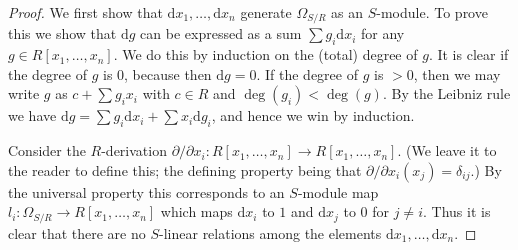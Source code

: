 \documentclass[10pt,a4paper]{amsart}
\theoremstyle{plain}
\theoremstyle{definition}
\theoremstyle{remark}
\numberwithin{equation}{subsection}
\begin{document}
\begin{proof}
We first show that $\text{d}x_1, \ldots, \text{d}x_n$
generate $\Omega_{S/R}$ as an $S$-module. To prove this
we show that $\text{d}g$ can be expressed as a
sum $\sum g_i \text{d}x_i$ for any $g \in R[x_1, \ldots, x_n]$.
We do this by induction on the (total) degree of $g$.
It is clear if the degree of $g$ is $0$, because then
$\text{d}g = 0$. If the degree of $g$ is $> 0$, then
we may write $g$ as $c + \sum g_i x_i$ with $c\in R$
and $\deg(g_i) < \deg(g)$. By the Leibniz rule we have
$\text{d}g = \sum g_i \text{d} x_i + \sum x_i \text{d}g_i$,
and hence we win by induction.

\medskip\noindent
Consider the $R$-derivation $\partial / \partial x_i :
R[x_1, \ldots, x_n] \to R[x_1, \ldots, x_n]$. (We leave it to
the reader to define this; the defining property
being that $\partial / \partial x_i (x_j) = \delta_{ij}$.)
By the universal property this corresponds to an $S$-module map $l_i :
\Omega_{S/R} \to R[x_1, \ldots, x_n]$ which maps $\text{d}x_i$
to $1$ and $\text{d}x_j$ to $0$ for $j \not = i$.
Thus it is clear that there are no $S$-linear relations
among the elements $\text{d}x_1, \ldots, \text{d}x_n$.
\end{proof}
\end{document}

